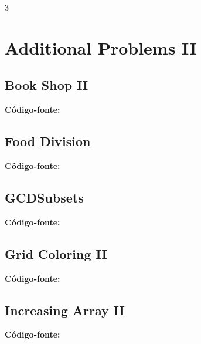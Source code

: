 \documentclass[8pt]{extarticle}
\begin{document}
\pagebreak
\begin{multicols*}{3}

\section{Additional Problems II}

\subsection{Book Shop II}
\begin{caixaenunciado}

\end{caixaenunciado}
\vspace{0.3cm}
\noindent\textbf{Código-fonte:}


\subsection{Food Division}
\begin{caixaenunciado}

\end{caixaenunciado}
\vspace{0.3cm}
\noindent\textbf{Código-fonte:}


\subsection{GCDSubsets}
\begin{caixaenunciado}

\end{caixaenunciado}
\vspace{0.3cm}
\noindent\textbf{Código-fonte:}


\subsection{Grid Coloring II}
\begin{caixaenunciado}

\end{caixaenunciado}
\vspace{0.3cm}
\noindent\textbf{Código-fonte:}


\subsection{Increasing Array II}
\begin{caixaenunciado}

\end{caixaenunciado}
\vspace{0.3cm}
\noindent\textbf{Código-fonte:}



\end{multicols*}
\end{document}
